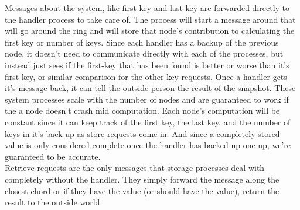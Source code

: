 \documentclass[12pt,letterpaper]{article}
\begin{document}
Messages about the system, like first-key and last-key are forwarded directly to the handler process to take care of. The process will start a message around that will go around the ring and will store that node's contribution to calculating the first key or number of keys. Since each handler has a backup of the previous node, it doesn't need to communicate directly with each of the processes, but instead just sees if the first-key that has been found is better or worse than it's first key, or similar comparison for the other key requests. Once a handler gets it's message back, it can tell the outside person the result of the snapshot. These system processes scale with the number of nodes and are guaranteed to work if the a node doesn't crash mid computation. Each node's computation will be constant since it can keep track of the first key, the last key, and the number of keys in it's back up as store requests come in. And since a completely stored value is only considered complete once the handler has backed up one up, we're guaranteed to be accurate. \\
Retrieve requests are the only messages that storage processes deal with completely without the handler. They simply forward the message along the closest chord or if they have the value (or should have the value), return the result to the outside world.
\end{document}
